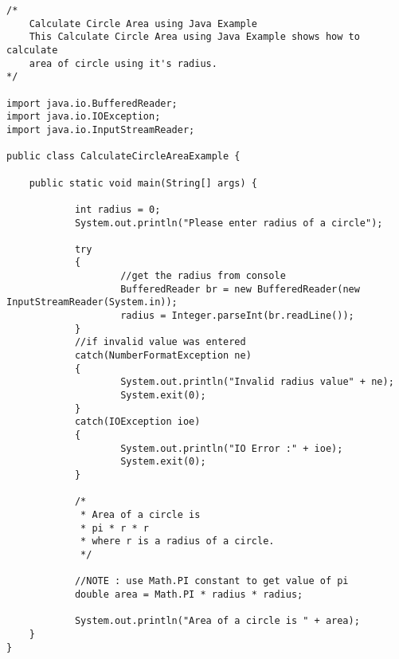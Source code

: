 \documentclass{article}
\begin{document}
\begin{lstlisting}[tabsize=2] % Java
/*
    Calculate Circle Area using Java Example
    This Calculate Circle Area using Java Example shows how to calculate
    area of circle using it's radius.
*/

import java.io.BufferedReader;
import java.io.IOException;
import java.io.InputStreamReader;

public class CalculateCircleAreaExample {

    public static void main(String[] args) {

            int radius = 0;
            System.out.println("Please enter radius of a circle");

            try
            {
                    //get the radius from console
                    BufferedReader br = new BufferedReader(new InputStreamReader(System.in));
                    radius = Integer.parseInt(br.readLine());
            }
            //if invalid value was entered
            catch(NumberFormatException ne)
            {
                    System.out.println("Invalid radius value" + ne);
                    System.exit(0);
            }
            catch(IOException ioe)
            {
                    System.out.println("IO Error :" + ioe);
                    System.exit(0);
            }

            /*
             * Area of a circle is
             * pi * r * r
             * where r is a radius of a circle.
             */

            //NOTE : use Math.PI constant to get value of pi
            double area = Math.PI * radius * radius;

            System.out.println("Area of a circle is " + area);
    }
}
\end{lstlisting}
\end{document}
